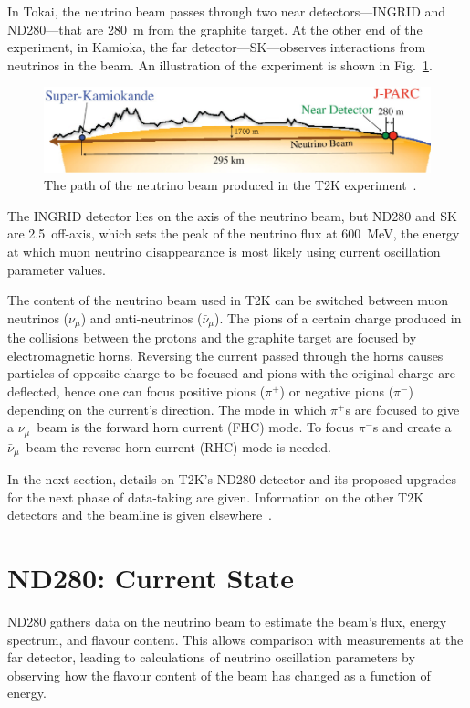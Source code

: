 \documentclass[aps,pra,12pt,notitlepage,tightenlines]{revtex4-1}
\newcommand{\numu}{$\nu_\mu$}
\newcommand{\anumu}{$\bar\nu_\mu$}
\begin{document}
In Tokai, the neutrino beam passes through two near detectors---INGRID and ND280---that are 280~m from the graphite target. At the other end of the experiment, in Kamioka, the far detector---SK---observes interactions from neutrinos in the beam. An illustration of the experiment is shown in Fig.~\ref{fig:t2k}.
\begin{figure}
 \includegraphics[scale=0.6]{T2K}
 \caption{The path of the neutrino beam produced in the T2K experiment~\cite{ABE2011106}.}
 \label{fig:t2k}
\end{figure}

The INGRID detector lies on the axis of the neutrino beam, but ND280 and SK are 2.5\degree\ off-axis, which sets the peak of the neutrino flux at 600~MeV, the energy at which muon neutrino disappearance is most likely using current oscillation parameter values.

The content of the neutrino beam used in T2K can be switched between muon neutrinos (\numu) and anti-neutrinos (\anumu). The pions of a certain charge produced in the collisions between the protons and the graphite target are focused by electromagnetic horns. Reversing the current passed through the horns causes particles of opposite charge to be focused and pions with the original charge are deflected, hence one can focus positive pions ($\pi^+$) or negative pions ($\pi^-$) depending on the current's direction. The mode in which $\pi^+$s are focused to give a \numu \ beam is the forward horn current (FHC) mode. To focus $\pi^-$s and create a \anumu \ beam the reverse horn current (RHC) mode is needed.

In the next section, details on T2K's ND280 detector and its proposed upgrades for the next phase of data-taking are given. Information on the other T2K detectors and the beamline is given elsewhere~\cite{ABE2011106}.

\section{ND280: Current State}
ND280 gathers data on the neutrino beam to estimate the beam's flux, energy spectrum, and flavour content. This allows comparison with measurements at the far detector, leading to calculations of neutrino oscillation parameters by observing how the flavour content of the beam has changed as a function of energy. 
\end{document}
